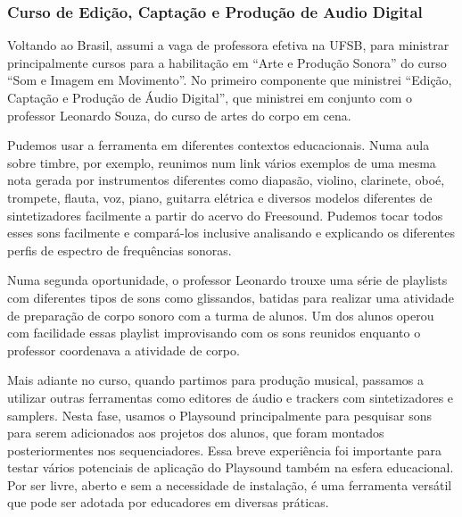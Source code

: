 \subsubsection{Curso de Edição, Captação e Produção de Audio Digital}

Voltando ao Brasil, assumi a vaga de professora efetiva na UFSB, para ministrar principalmente cursos para a habilitação em ``Arte e Produção Sonora'' do curso ``Som e Imagem em Movimento''. No primeiro componente que ministrei ``Edição, Captação e Produção de Áudio Digital'', que ministrei em conjunto com o professor Leonardo Souza, do curso de artes do corpo em cena.

Pudemos usar a ferramenta em diferentes contextos educacionais. Numa aula sobre timbre, por exemplo, reunimos num link vários exemplos de uma mesma nota gerada por instrumentos diferentes como diapasão, violino, clarinete, oboé, trompete, flauta, voz, piano, guitarra elétrica e diversos modelos diferentes de sintetizadores facilmente a partir do acervo do Freesound. Pudemos tocar todos esses sons facilmente e compará-los inclusive analisando e explicando os diferentes perfis de espectro de frequências sonoras.

Numa segunda oportunidade, o professor Leonardo trouxe uma série de playlists com diferentes tipos de sons como glissandos, batidas para realizar uma atividade de preparação de corpo sonoro com a turma de alunos. Um dos alunos operou com facilidade essas playlist improvisando com os sons reunidos enquanto o professor coordenava a atividade de corpo. 

Mais adiante no curso, quando partimos para produção musical, passamos a utilizar outras ferramentas como editores de áudio e trackers com sintetizadores e samplers. Nesta fase, usamos o Playsound principalmente para pesquisar sons para serem adicionados aos projetos dos alunos, que foram montados posteriormentes nos sequenciadores. Essa breve experiência foi importante para testar vários potenciais de aplicação do Playsound também na esfera educacional. Por ser livre, aberto e sem a necessidade de instalação, é uma ferramenta versátil que pode ser adotada por educadores em diversas práticas.

